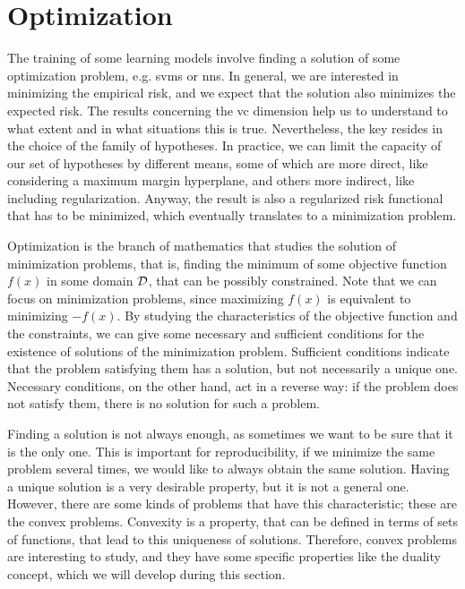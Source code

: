 \section{Optimization}
%
The training of some learning models involve finding a solution of some optimization problem, e.g. \acrshort{svms} or \acrshort{nns}.
%
In general, we are interested in minimizing the empirical risk, and we expect that the solution also minimizes the expected risk. The results concerning the \acrshort{vc} dimension help us to understand to what extent and in what situations this is true. Nevertheless, the key resides in the choice of the family of hypotheses.
%
In practice, we can limit the capacity of our set of hypotheses by different means, some of which are more direct, like considering a maximum margin hyperplane, and others more indirect, like including regularization. Anyway, the result is also a regularized risk functional that has to be minimized, which eventually translates to a minimization problem.

%
Optimization is the branch of mathematics that studies the solution of minimization problems, that is, finding the minimum of some objective function $f(x)$ in some domain $\mathcal{D}$, that can be possibly constrained. Note that we can focus on minimization problems, since maximizing $f(x)$ is equivalent to minimizing $-f(x)$.
%
By studying the characteristics of the objective function and the constraints, we can give some necessary and sufficient conditions for the existence of solutions of the minimization problem. Sufficient conditions indicate that the problem satisfying them has a solution, but not necessarily a unique one. Necessary conditions, on the other hand, act in a reverse way: if the problem does not satisfy them, there is no solution for such a problem.
%

Finding a solution is not always enough, as sometimes we want to be sure that it is the only one. This is important for reproducibility, if we minimize the same problem several times, we would like to always obtain the same solution.
%
Having a unique solution is a very desirable property, but it is not a general one. However, there are some kinds of problems that have this characteristic; these are the convex problems. Convexity is a property, that can be defined in terms of sets of functions, that lead to this uniqueness of solutions.
%
Therefore, convex problems are interesting to study, and they have some specific properties like the duality concept, which we will develop during this section.

